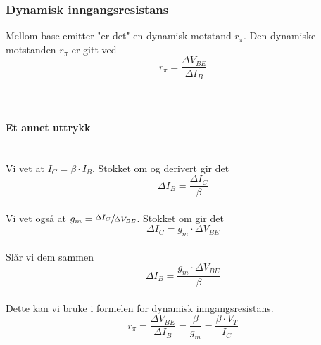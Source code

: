 \subsubsection{Dynamisk inngangsresistans}
Mellom base-emitter "er det" en dynamisk motstand $r_\pi$.
Den dynamiske motstanden $r_\pi$ er gitt ved
$$r_\pi = \frac{\Delta V_{BE}}{\Delta I_B}$$
\\\\
\paragraph{Et annet uttrykk} \mbox{} \\
Vi vet at $I_C = \beta \cdot I_B$.
Stokket om og derivert gir det
$$\Delta I_B = \frac{\Delta I_C}{\beta}$$
\\
Vi vet også at $g_m = \sfrac{\Delta I_C}{\Delta V_{BE}}$.
Stokket om gir det
$$\Delta I_C = g_m \cdot \Delta V_{BE}$$
\\
Slår vi dem sammen
$$\Delta I_B = \frac{g_m \cdot \Delta V_{BE}}{\beta}$$
\\
Dette kan vi bruke i formelen for dynamisk inngangsresistans.
$$r_\pi = \frac{\Delta V_{BE}}{\Delta I_B}
= \frac{\beta}{g_m} = \frac{\beta \cdot V_T}{I_C}$$
